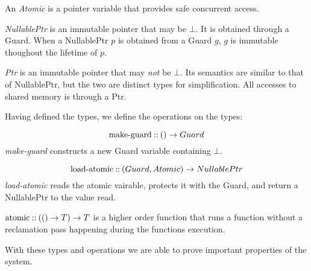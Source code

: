 \begin{definition}[Atomic]
  An \emph{Atomic} is a pointer variable that provides safe concurrent access.
\end{definition}

\begin{definition}[NullablePtr]
  \emph{NullablePtr} is an immutable pointer that may be $\bot$. It is obtained through a Guard.
  When a NullablePtr $p$ is obtained from a Guard $g$, $g$ is immutable thoughout the lifetime of
  $p$.
\end{definition}

\begin{definition}[Ptr]
  \emph{Ptr} is an immutable pointer that may \emph{not} be $\bot$. Its semantics are similar to
  that of NullablePtr, but the two are distinct types for simplification. All accesses to shared
  memory is through a Ptr.
\end{definition}


Having defined the types, we define the operations on the types:

\begin{definition}
\begin{equation}\label{eq:make-guard}
  \text{make-guard\:::\:} () \to Guard
\end{equation}
\emph{make-guard} constructs a new Guard variable containing $\bot$.

\begin{equation}\label{eq:load-atomic}
  \text{load-atomic\:::\:} (Guard, Atomic) \to NullablePtr
\end{equation}
\emph{load-atomic} reads the atomic vairable, protects it with the Guard, and return a NullablePtr
to the value read.
\end{definition}

\begin{definition}\label{def:atomic}
  $\text{atomic\:::\:} (() \to T) \to T$ is a higher order function that runs a function without
  a reclamation pass happening during the functions execution.
\end{definition}




With these types and operations we are able to prove important properties of the system.

